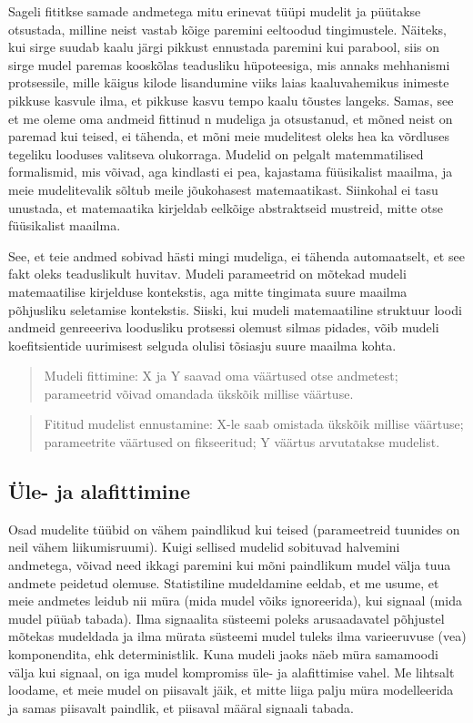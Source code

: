 \documentclass[]{book}
\begin{document}
Sageli fititkse samade andmetega mitu erinevat tüüpi mudelit ja püütakse
otsustada, milline neist vastab kõige paremini eeltoodud tingimustele.
Näiteks, kui sirge suudab kaalu järgi pikkust ennustada paremini kui
parabool, siis on sirge mudel paremas kooskõlas teadusliku hüpoteesiga,
mis annaks mehhanismi protsessile, mille käigus kilode lisandumine viiks
laias kaaluvahemikus inimeste pikkuse kasvule ilma, et pikkuse kasvu
tempo kaalu tõustes langeks. Samas, see et me oleme oma andmeid fittinud
n mudeliga ja otsustanud, et mõned neist on paremad kui teised, ei
tähenda, et mõni meie mudelitest oleks hea ka võrdluses tegeliku
looduses valitseva olukorraga. Mudelid on pelgalt matemmatilised
formalismid, mis võivad, aga kindlasti ei pea, kajastama füüsikalist
maailma, ja meie mudelitevalik sõltub meile jõukohasest matemaatikast.
Siinkohal ei tasu unustada, et matemaatika kirjeldab eelkõige
abstraktseid mustreid, mitte otse füüsikalist maailma.

See, et teie andmed sobivad hästi mingi mudeliga, ei tähenda
automaatselt, et see fakt oleks teaduslikult huvitav. Mudeli parameetrid
on mõtekad mudeli matemaatilise kirjelduse kontekstis, aga mitte
tingimata suure maailma põhjusliku seletamise kontekstis. Siiski, kui
mudeli matemaatiline struktuur loodi andmeid genreeeriva loodusliku
protsessi olemust silmas pidades, võib mudeli koefitsientide uurimisest
selguda olulisi tõsiasju suure maailma kohta.

\begin{quote}
Mudeli fittimine: X ja Y saavad oma väärtused otse andmetest;
parameetrid võivad omandada ükskõik millise väärtuse.
\end{quote}

\begin{quote}
Fititud mudelist ennustamine: X-le saab omistada ükskõik millise
väärtuse; parameetrite väärtused on fikseeritud; Y väärtus arvutatakse
mudelist.
\end{quote}

\subsection{Üle- ja alafittimine}\label{ule--ja-alafittimine}

Osad mudelite tüübid on vähem paindlikud kui teised (parameetreid
tuunides on neil vähem liikumisruumi). Kuigi sellised mudelid sobituvad
halvemini andmetega, võivad need ikkagi paremini kui mõni paindlikum
mudel välja tuua andmete peidetud olemuse. Statistiline mudeldamine
eeldab, et me usume, et meie andmetes leidub nii müra (mida mudel võiks
ignoreerida), kui signaal (mida mudel püüab tabada). Ilma signaalita
süsteemi poleks arusaadavatel põhjustel mõtekas mudeldada ja ilma mürata
süsteemi mudel tuleks ilma varieeruvuse (vea) komponendita, ehk
deterministlik. Kuna mudeli jaoks näeb müra samamoodi välja kui signaal,
on iga mudel kompromiss üle- ja alafittimise vahel. Me lihtsalt loodame,
et meie mudel on piisavalt jäik, et mitte liiga palju müra modelleerida
ja samas piisavalt paindlik, et piisaval määral signaali tabada.
\end{document}
